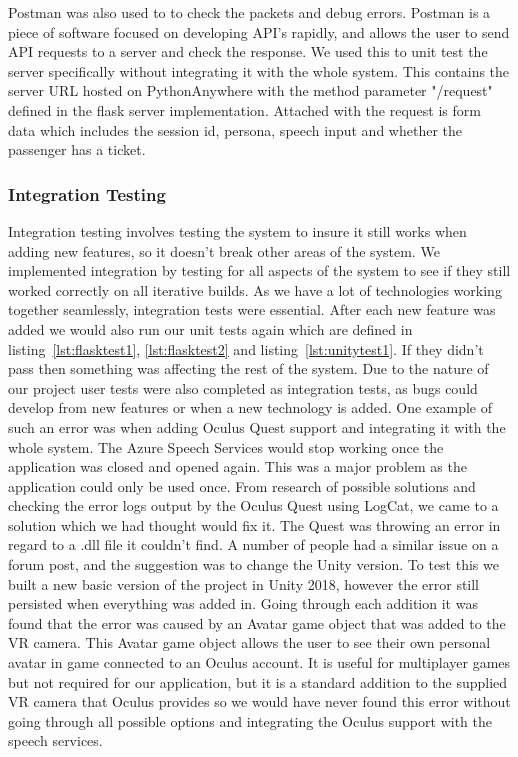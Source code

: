 Postman was also used to to check the packets and debug errors. Postman is a piece of software focused on developing API's rapidly, and allows the user to send API requests to a server and check the response. We used this to unit test the server specifically without integrating it with the whole system. This contains the server URL hosted on PythonAnywhere with the method parameter "/request" defined in the flask server implementation. Attached with the request is form data which includes the session id, persona, speech input and whether the passenger has a ticket.

\subsubsection{Integration Testing}
Integration testing involves testing the system to insure it still works when adding new features, so it doesn't break other areas of the system. We implemented integration by testing for all aspects of the system to see if they still worked correctly on all iterative builds. As we have a lot of technologies working together seamlessly, integration tests were essential. After each new feature was added we would also run our unit tests again which are defined in listing~\ref{lst:flasktest1}, \ref{lst:flasktest2} and listing~\ref{lst:unitytest1}. If they didn't pass then something was affecting the rest of the system. Due to the nature of our project user tests were also completed as integration tests, as bugs could develop from new features or when a new technology is added. One example of such an error was when adding Oculus Quest support and integrating it with the whole system. The Azure Speech Services would stop working once the application was closed and opened again. This was a major problem as the application could only be used once. From research of possible solutions and checking the error logs output by the Oculus Quest using LogCat, we came to a solution which we had thought would fix it. The Quest was throwing an error in regard to a .dll file it couldn't find. A number of people had a similar issue on a forum post, and the suggestion was to change the Unity version. To test this we built a new basic version of the project in Unity 2018, however the error still persisted when everything was added in. Going through each addition it was found that the error was caused by an Avatar game object that was added to the VR camera. This Avatar game object allows the user to see their own personal avatar in game connected to an Oculus account. It is useful for multiplayer games but not required for our application, but it is a standard addition to the supplied VR camera that Oculus provides so we would have never found this error without going through all possible options and integrating the Oculus support with the speech services.

